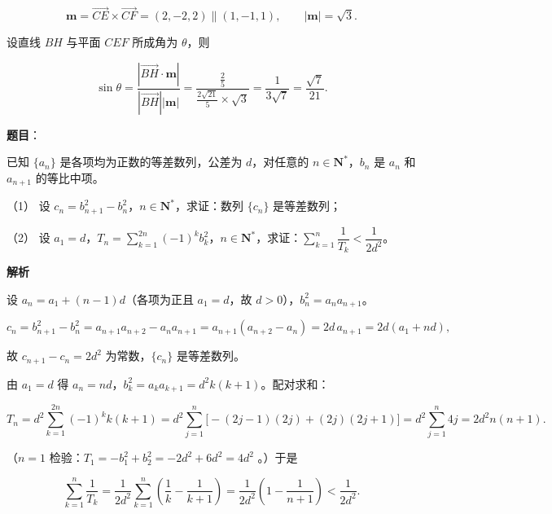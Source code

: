 \begin{answer}
\nopagebreak[4]
\[
\boldsymbol m=\overrightarrow{CE}\times\overrightarrow{CF}=(2,-2,2)\parallel(1,-1,1),\qquad|\boldsymbol m|=\sqrt{3}.
\]

设直线 \(BH\) 与平面 \(CEF\) 所成角为 \(\theta\)，则

\nopagebreak[4]
\[
\sin\theta=\frac{|\overrightarrow{BH}\cdot\boldsymbol m|}{|\overrightarrow{BH}||\boldsymbol m|}
=\frac{\frac{2}{5}}{\frac{2\sqrt{21}}{5}\times\sqrt{3}}=\frac{1}{3\sqrt{7}}=\frac{\sqrt{7}}{21}.
\]




\end{answer}
\begin{answer}

\textbf{题目}：

已知 \(\{a_{n}\}\) 是各项均为正数的等差数列，公差为 \(d\)，对任意的 \(n\in\mathbf{N}^{*}\)，\(b_{n}\) 是 \(a_{n}\) 和 \(a_{n+1}\) 的等比中项。

（1） 设 \(c_{n}=b_{n+1}^{2}-b_{n}^{2}\)，\(n\in\mathbf{N}^{*}\)，求证：数列 \(\{c_{n}\}\) 是等差数列；

（2） 设 \(a_{1}=d\)，\(T_{n}=\displaystyle\sum_{k=1}^{2n}(-1)^{k}b_{k}^{2}\)，\(n\in\mathbf{N}^{*}\)，求证：\(\displaystyle\sum_{k=1}^{n}\dfrac{1}{T_{k}}<\dfrac{1}{2d^{2}}\)。

\textbf{解析}

设 \(a_{n}=a_{1}+(n-1)d\)（各项为正且 \(a_{1}=d\)，故 \(d>0\)），\(b_{n}^{2}=a_{n}a_{n+1}\)。


\nopagebreak[4]
\[
c_{n}=b_{n+1}^{2}-b_{n}^{2}=a_{n+1}a_{n+2}-a_{n}a_{n+1}=a_{n+1}(a_{n+2}-a_{n})=2d\,a_{n+1}=2d(a_{1}+nd),
\]

故 \(c_{n+1}-c_{n}=2d^{2}\) 为常数，\(\{c_{n}\}\) 是等差数列。


由 \(a_{1}=d\) 得 \(a_{n}=nd\)，\(b_{k}^{2}=a_{k}a_{k+1}=d^{2}k(k+1)\)。配对求和：

\nopagebreak[4]
\[
T_{n}=d^{2}\sum_{k=1}^{2n}(-1)^{k}k(k+1)=d^{2}\sum_{j=1}^{n}\big[-(2j-1)(2j)+(2j)(2j+1)\big]=d^{2}\sum_{j=1}^{n}4j=2d^{2}n(n+1).
\]

（\(n=1\) 检验：\(T_{1}=-b_{1}^{2}+b_{2}^{2}=-2d^{2}+6d^{2}=4d^{2}\) 。）于是

\nopagebreak[4]
\[
\sum_{k=1}^{n}\frac{1}{T_{k}}=\frac{1}{2d^{2}}\sum_{k=1}^{n}\left(\frac{1}{k}-\frac{1}{k+1}\right)=\frac{1}{2d^{2}}\left(1-\frac{1}{n+1}\right)<\frac{1}{2d^{2}}.
\]



\end{answer}
